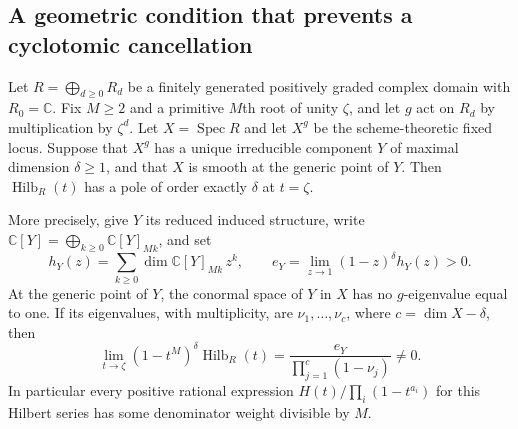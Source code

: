 \subsection{A geometric condition that prevents a cyclotomic cancellation}

\begin{proposition}
\label{prop:fixedcomponentpole}
Let $R=\bigoplus_{d\ge0}R_d$ be a finitely generated positively
graded complex domain with $R_0=\mathbb C$. Fix $M\ge2$ and a
primitive $M$th root of unity $\zeta$, and let $g$ act on $R_d$
by multiplication by $\zeta^d$. Let $X=\operatorname{Spec}R$ and
let $X^g$ be the scheme-theoretic fixed locus. Suppose that
$X^g$ has a unique irreducible component $Y$ of maximal dimension
$\delta\ge1$, and that $X$ is smooth at the generic point of $Y$.
Then $\operatorname{Hilb}_R(t)$ has a pole of order exactly
$\delta$ at $t=\zeta$.

More precisely, give $Y$ its reduced induced structure, write
$\mathbb C[Y]=\bigoplus_{k\ge0}\mathbb C[Y]_{Mk}$, and set
\[
 h_Y(z)=\sum_{k\ge0}\dim\mathbb C[Y]_{Mk}\,z^k,
 \qquad
 e_Y=\lim_{z\to1}(1-z)^\delta h_Y(z)>0.
\]
At the generic point of $Y$, the conormal space of $Y$ in $X$
has no $g$-eigenvalue equal to one. If its eigenvalues, with
multiplicity, are $\nu_1,\ldots,\nu_c$, where
$c=\dim X-\delta$, then
\[
 \lim_{t\to\zeta}(1-t^M)^\delta\operatorname{Hilb}_R(t)
       =\frac{e_Y}{\prod_{j=1}^c(1-\nu_j)}\ne0.
 \tag{P-F23a}
\]
In particular every positive rational expression
$H(t)/\prod_i(1-t^{a_i})$ for this Hilbert series has some
denominator weight divisible by $M$.
\end{proposition}

